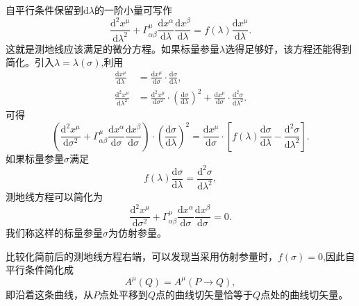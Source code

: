 \documentclass[11pt, a4paper, oneside, onecolumn]{ctexart}
\numberwithin{equation}{subsection}
\begin{document}
自平行条件保留到$\mathrm{d}\lambda$的一阶小量可写作
\begin{equation}
\frac{\mathrm{d}^{2}x^{\mu}}{\mathrm{d}\lambda^{2}}+\Gamma_{\alpha\beta}^{\mu}\frac{\mathrm{d}x^{\alpha}}{\mathrm{d}\lambda}\frac{\mathrm{d}x^{\beta}}{\mathrm{d}\lambda}=f\left(\lambda\right)\frac{\mathrm{d}x^{\mu}}{\mathrm{d}\lambda}.
\end{equation}
这就是测地线应该满足的微分方程。如果标量参量$\lambda$选得足够好，该方程还能得到简化。引入$\lambda=\lambda\left(\sigma\right)$,利用
\begin{align}
\frac{\mathrm{d}x^{\mu}}{\mathrm{d}\lambda}&=\frac{\mathrm{d}x^{\mu}}{\mathrm{d}\sigma}\cdot\frac{\mathrm{d}\sigma}{\mathrm{d}\lambda},\\
\frac{\mathrm{d}^{2}x^{\mu}}{\mathrm{d}\lambda^{2}}&=\frac{\mathrm{d}^{2}x^{\mu}}{\mathrm{d}\sigma^{2}}\cdot\left(\frac{\mathrm{d}\sigma}{\mathrm{d}\lambda}\right)^{2}+\frac{\mathrm{d}x^{\mu}}{\mathrm{d}\sigma}\cdot\frac{\mathrm{d}^{2}\sigma}{\mathrm{d}\lambda^{2}}.
\end{align}
可得
\begin{equation}
\left(\frac{\mathrm{d}^{2}x^{\mu}}{\mathrm{d}\sigma^{2}}+\Gamma_{\alpha\beta}^{\mu}\frac{\mathrm{d}x^{\alpha}}{\mathrm{d}\sigma}\frac{\mathrm{d}x^{\beta}}{\mathrm{d}\sigma}\right)\cdot\left(\frac{\mathrm{d}\sigma}{\mathrm{d}\lambda}\right)^{2}=\frac{\mathrm{d}x^{\mu}}{\mathrm{d}\sigma}\cdot\left[f\left(\lambda\right)\frac{\mathrm{d}\sigma}{\mathrm{d}\lambda}-\frac{\mathrm{d}^{2}\sigma}{\mathrm{d}\lambda^{2}}\right].
\end{equation}
如果标量参量$\sigma$满足
\begin{equation}
f\left(\lambda\right)\frac{\mathrm{d}\sigma}{\mathrm{d}\lambda}=\frac{\mathrm{d}^{2}\sigma}{\mathrm{d}\lambda^{2}},\label{1.4.12}
\end{equation}
测地线方程可以简化为
\begin{equation}
\frac{\mathrm{d}^{2}x^{\mu}}{\mathrm{d}\sigma^{2}}+\Gamma_{\alpha\beta}^{\mu}\frac{\mathrm{d}x^{\alpha}}{\mathrm{d}\sigma}\frac{\mathrm{d}x^{\beta}}{\mathrm{d}\sigma}=0.
\end{equation}
我们称这样的标量参量$\sigma$为仿射参量。

比较化简前后的测地线方程右端，可以发现当采用仿射参量时，$f\left(\sigma\right)=0$,因此自平行条件简化成
\begin{equation}
A^{\mu}\left(Q\right)=A^{\mu}\left(P\to Q\right),
\end{equation}
即沿着这条曲线，从$P$点处平移到$Q$点的曲线切矢量恰等于$Q$点处的曲线切矢量。
\end{document}
